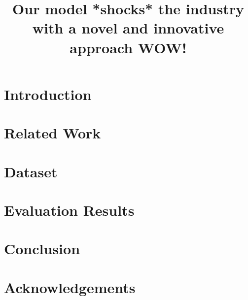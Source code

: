 \documentclass[10pt, a4paper]{article}
\title{{\color{red} Our model *shocks* the industry with a novel and innovative approach WOW!}}
\begin{document}
\maketitleabstract

\section{Introduction}


\section{Related Work}


\section{Dataset}


\section{Evaluation Results}


\section{Conclusion}


\section{Acknowledgements}




 
\end{document}
